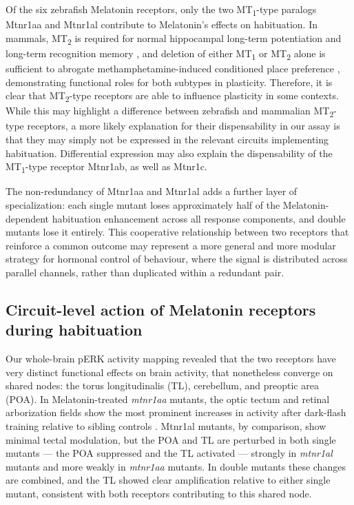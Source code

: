 \documentclass[9.5pt]{RandlettLab_elife}            %
\begin{document}
Of the six zebrafish Melatonin receptors, only the two MT\textsubscript{1}-type paralogs Mtnr1aa and Mtnr1al contribute to Melatonin's effects on habituation.
In mammals, MT\textsubscript{2} is required for normal hippocampal long-term potentiation \citep{Larson2006} and long-term recognition memory \citep{Pistono2021}, and deletion of either MT\textsubscript{1} or MT\textsubscript{2} alone is sufficient to abrogate methamphetamine-induced conditioned place preference \citep{Clough2014}, demonstrating functional roles for both subtypes in plasticity.
Therefore, it is clear that MT\textsubscript{2}-type receptors are able to influence plasticity in some contexts. 
While this may highlight a difference between zebrafish and mammalian MT\textsubscript{2}-type receptors, a more likely explanation for their dispensability in our assay is that they may simply not be expressed in the relevant circuits implementing habituation. 
Differential expression may also explain the dispensability of the MT\textsubscript{1}-type receptor Mtnr1ab, as well as Mtnr1c.

The non-redundancy of Mtnr1aa and Mtnr1al adds a further layer of specialization: each single mutant loses approximately half of the Melatonin-dependent habituation enhancement across all response components, and double mutants lose it entirely.
This cooperative relationship between two receptors that reinforce a common outcome may represent a more general and more modular strategy for hormonal control of behaviour, where the signal is distributed across parallel channels, rather than duplicated within a redundant pair.

\subsection*{Circuit-level action of Melatonin receptors during habituation}

Our whole-brain pERK activity mapping revealed that the two receptors have very distinct functional effects on brain activity, that nonetheless converge on shared nodes: the torus longitudinalis (TL), cerebellum, and preoptic area (POA).
In Melatonin-treated \emph{mtnr1aa} mutants, the optic tectum and retinal arborization fields show the most prominent increases in activity after dark-flash training relative to sibling controls \citep{Randlett2019-fj, Lamire2023-he}.
Mtnr1al mutants, by comparison, show minimal tectal modulation, but the POA and TL are perturbed in both single mutants — the POA suppressed and the TL activated — strongly in \emph{mtnr1al} mutants and more weakly in \emph{mtnr1aa} mutants.
In double mutants these changes are combined, and the TL showed clear amplification relative to either single mutant, consistent with both receptors contributing to this shared node. 
\end{document}
